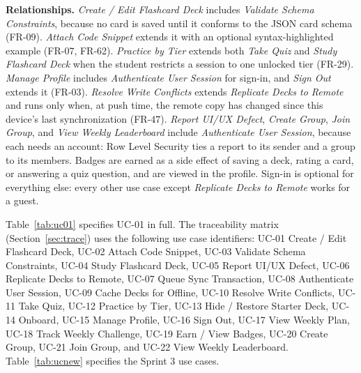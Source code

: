 \documentclass[12pt,letterpaper]{article}
\begin{document}
\textbf{Relationships.} \emph{Create / Edit Flashcard Deck} includes \emph{Validate
Schema Constraints}, because no card is saved until it conforms to the JSON card schema
(FR-09). \emph{Attach Code Snippet} extends it with an optional syntax-highlighted
example (FR-07, FR-62). \emph{Practice by Tier} extends both \emph{Take Quiz} and
\emph{Study Flashcard Deck} when the student restricts a session to one unlocked tier
(FR-29). \emph{Manage Profile} includes \emph{Authenticate User Session} for sign-in,
and \emph{Sign Out} extends it (FR-03). \emph{Resolve Write Conflicts} extends
\emph{Replicate Decks to Remote} and runs only when, at push time, the remote copy has
changed since this device's last synchronization (FR-47). \emph{Report UI/UX Defect},
\emph{Create Group}, \emph{Join Group}, and \emph{View Weekly Leaderboard} include
\emph{Authenticate User Session}, because each needs an account: Row Level Security
ties a report to its sender and a group to its members. Badges are earned as a side
effect of saving a deck, rating a card, or answering a quiz question, and are viewed
in the profile. Sign-in is optional for everything else: every other use case except
\emph{Replicate Decks to Remote} works for a guest.

Table~\ref{tab:uc01} specifies UC-01 in full. The traceability matrix
(Section~\ref{sec:trace}) uses the following use case identifiers: UC-01 Create / Edit
Flashcard Deck, UC-02 Attach Code Snippet, UC-03 Validate Schema Constraints, UC-04
Study Flashcard Deck, UC-05 Report UI/UX Defect, UC-06 Replicate Decks to Remote, UC-07
Queue Sync Transaction, UC-08 Authenticate User Session, UC-09 Cache Decks for Offline,
UC-10 Resolve Write Conflicts, UC-11 Take Quiz, UC-12 Practice by Tier, UC-13 Hide /
Restore Starter Deck, UC-14 Onboard, UC-15 Manage Profile, UC-16 Sign Out, UC-17 View
Weekly Plan, UC-18 Track Weekly Challenge, UC-19 Earn / View Badges, UC-20 Create Group,
UC-21 Join Group, and UC-22 View Weekly Leaderboard. Table~\ref{tab:ucnew} specifies the
Sprint 3 use cases.
\end{document}
